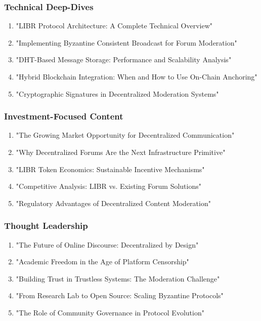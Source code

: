 \documentclass[12pt,a4paper]{article}
\begin{document}
\subsubsection{Technical Deep-Dives}
\begin{enumerate}
    \item "LIBR Protocol Architecture: A Complete Technical Overview"
    \item "Implementing Byzantine Consistent Broadcast for Forum Moderation"
    \item "DHT-Based Message Storage: Performance and Scalability Analysis"
    \item "Hybrid Blockchain Integration: When and How to Use On-Chain Anchoring"
    \item "Cryptographic Signatures in Decentralized Moderation Systems"
\end{enumerate}

\subsubsection{Investment-Focused Content}
\begin{enumerate}
    \item "The Growing Market Opportunity for Decentralized Communication"
    \item "Why Decentralized Forums Are the Next Infrastructure Primitive"
    \item "LIBR Token Economics: Sustainable Incentive Mechanisms"
    \item "Competitive Analysis: LIBR vs. Existing Forum Solutions"
    \item "Regulatory Advantages of Decentralized Content Moderation"
\end{enumerate}

\subsubsection{Thought Leadership}
\begin{enumerate}
    \item "The Future of Online Discourse: Decentralized by Design"
    \item "Academic Freedom in the Age of Platform Censorship"
    \item "Building Trust in Trustless Systems: The Moderation Challenge"
    \item "From Research Lab to Open Source: Scaling Byzantine Protocols"
    \item "The Role of Community Governance in Protocol Evolution"
\end{enumerate}
\end{document}
